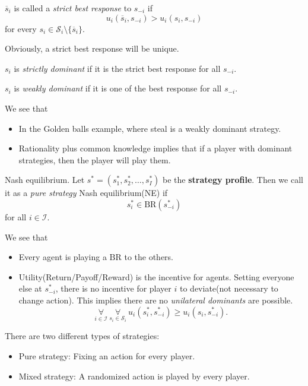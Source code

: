 \begin{definition}
	\(\overline{s}_{i}\) is called a \emph{strict best response} to \(s_{-i}\) if
	\[
		u_{i}(\overline{s}_i, s_{-i})>u_{i}(s_{i}, s_{-i})
	\]
	for every \(s_{i}\in \mathcal{S}_{i}\setminus\{\overline{s}_i\} \).
\end{definition}

\begin{remark}
	Obviously, a strict best response will be unique.
\end{remark}

\begin{definition}
	\(s_{i}\) is \emph{strictly dominant} if it is the strict best response for all \(s_{-i}\).
\end{definition}
\begin{definition}
	\(s_{i}\) is \emph{weakly dominant} if it is one of the best response for all \(s_{-i}\).
\end{definition}

\begin{remark}
	We see that
	\begin{itemize}
		\item In the Golden balls example, where steal is a weakly dominant strategy.
		\item Rationality plus common knowledge implies that if a player with dominant strategies, then the player will play them.
	\end{itemize}
\end{remark}

\hr

\begin{prev}
	Nash equilibrium. Let \(s^{\ast} = (s_1^{\ast}, s_2^{\ast}, \ldots , s_I^{\ast})\) be the \textbf{strategy profile}. Then we call it as a
	\emph{pure strategy} Nash equilibrium(NE) if
	\[
		s_{i}^{\ast}\in\mathrm{BR}(s_{-i}^{\ast})
	\]
	for all \(i\in \mathcal{I} \).
\end{prev}

\begin{note}
	We see that
	\begin{itemize}
		\item Every agent is playing a \(\mathrm{BR}\) to the others.
		\item Utility(Return/Payoff/Reward) is the incentive for agents. Setting everyone else at \(s^{\ast}_{-i}\), there is no incentive for player \(i\) to deviate(not necessary to change action). This implies there are no \emph{unilateral dominants} are possible.
		      \[
			      \underset{i\in \mathcal{I}}{\forall}\ \underset{s_{i}\in \mathcal{S}_i}{\forall}\ u_{i}(s^{\ast}_i, s^{\ast}_{-i}) \geq u_{i}(s_{i}, s^{\ast}_{-i}).
		      \]
	\end{itemize}
	\begin{prev}
		There are two different types of strategies:
		\begin{itemize}
			\item Pure strategy: Fixing an action for every player.
			\item Mixed strategy: A randomized action is played by every player.
		\end{itemize}
	\end{prev}
\end{note}

